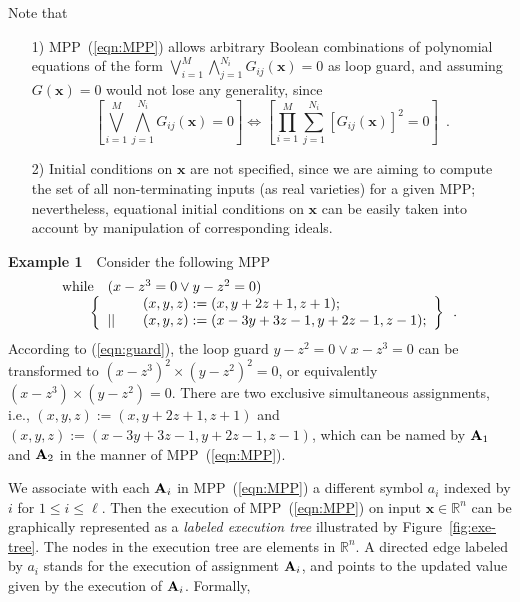 \documentclass{article}
\def\dsee#1{\vskip 0.3cm \noindent{\bf #1} \vskip 0.2cm}
\newcommand{\while}{{\rm while}}
\newcommand{\xx}{\mathbf{x}}
\begin{document}
Note that
\begin{enumerate}
\item[1)] MPP~(\ref{eqn:MPP}) allows arbitrary Boolean combinations of polynomial equations of the form $\bigvee_{i=1}^M \bigwedge_{j=1}^{N_i} G_{ij}(\xx)=0$ as loop guard, and assuming $G(\xx)=0$ would not lose any generality, since
    \begin{equation}\label{eqn:guard}
    \left[ \bigvee_{i=1}^M \bigwedge_{j=1}^{N_i} G_{ij}(\xx) = 0 \right]  \Longleftrightarrow \left[ \prod_{i=1}^M \sum_{j=1}^{N_i} [G_{ij}(\xx)]^2 = 0 \right] \enspace .
    \end{equation}
\item[2)] Initial conditions on $\xx$ are not specified, since we are aiming to compute the set of all non-terminating inputs (as real varieties) for a given MPP; nevertheless, equational initial conditions on $\xx$ can be easily taken into account by manipulation of corresponding ideals.
\end{enumerate}

{\bf Example 1}~~{Consider the following MPP
\[
\begin{array}{l}
\while \quad (x-z^3=0 \vee y-z^2=0) \\
\qquad \left\{
\begin{array}{ll}
 & \quad (x,y,z) := (x,y+2z+1,z+1); \\
|| & \quad (x,y,z) := (x-3y+3z-1,y+2z-1,z-1); \\
\end{array}
\right\} \enspace  .\\
\end{array}
\]
According to (\ref{eqn:guard}), the loop guard $y-z^2=0 \vee x-z^3=0$ can be transformed to $(x-z^3)^2 \times (y-z^2)^2=0$, or equivalently $(x-z^3) \times (y-z^2)=0$. There are two exclusive simultaneous assignments, i.e., $(x,y,z):=(x,y+2z+1,z+1)$ and $(x,y,z):=(x-3y+3z-1,y+2z-1,z-1)$, which can be named by ${\bf A}_1$ and ${\bf A}_2$ in the manner of MPP~(\ref{eqn:MPP}). }

    \dsee{3.2~~The Execution of MPPs}
    We associate with each ${\bf A}_i$ in MPP~(\ref{eqn:MPP}) a different symbol $a_i$ indexed by $i$ for $1 \leq i \leq \ell$. Then the execution of MPP~(\ref{eqn:MPP}) on input $\xx \in \mathbb{R}^n$ can be graphically represented as a \emph{labeled execution tree} illustrated by Figure~\ref{fig:exe-tree}. The nodes in the execution tree are elements in $\mathbb{R}^n$. A directed edge labeled by $a_i$ stands for the execution of assignment ${\bf A}_i$, and points to the updated value given by the execution of ${\bf A}_i$. Formally,
\end{document}

